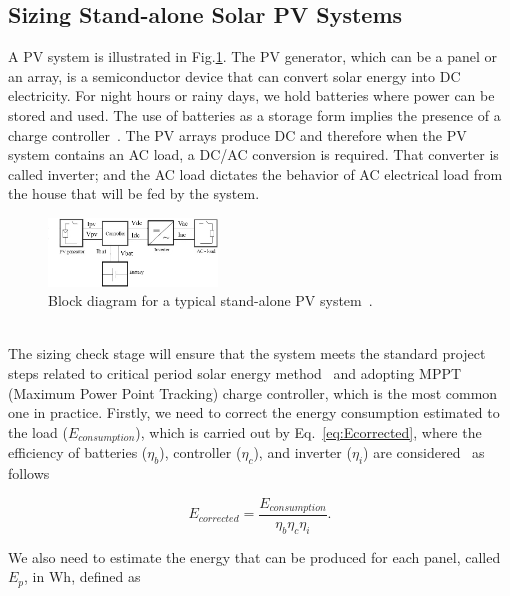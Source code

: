 \documentclass[review]{elsarticle}
\begin{document}
\subsection{Sizing Stand-alone Solar PV Systems}
\label{sec:sizing}
A PV system is illustrated in Fig.\ref{fig:blockdiagram}. %
The PV generator, which can be a panel or an array, is a semiconductor device that can convert solar energy into DC electricity. %
For night hours or rainy days, we hold batteries where power can be stored and used. The use of batteries as a storage form implies the presence of a charge controller~\cite{Hansen}. The PV arrays produce DC and therefore when the PV system contains an AC load, a DC/AC conversion is required. That converter is called inverter; and the AC load dictates the behavior of AC electrical load from the house that will be fed by the system.
\begin{figure}[h]
\includegraphics[width=0.4\textwidth]{blockdiagramPVS2_rev}
\centering
\caption{Block diagram for a typical stand-alone PV system~\cite{Hansen}.}
\label{fig:blockdiagram} 
\end{figure}
\\
%
The sizing check stage will ensure that the system meets the standard project steps related to critical period solar energy method~\cite{Pinho} and adopting MPPT (Maximum Power Point Tracking) charge controller, which is the most common one in practice. 
%
Firstly, we need to correct the energy consumption estimated to the load ($E_{consumption}$), which is carried out by Eq.~\eqref{eq:Ecorrected}, where the efficiency of batteries ($\eta_{b}$), controller ($\eta_{c}$), and inverter ($\eta_{i}$) are considered~\cite{Pinho} as follows

\begin{equation}
\label{eq:Ecorrected}
E_{corrected} = \dfrac{E_{consumption}}{\eta_{b} \eta_{c} \eta_{i} }.
\end{equation}

%
We also need to estimate the energy that can be produced for each panel, called $E_{p}$, in Wh, defined as
%
\end{document}
